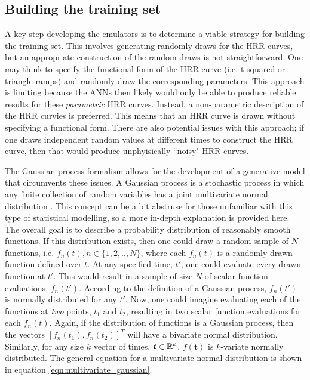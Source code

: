 \documentclass{article}
\begin{document}
\subsection{Building the training set}
A key step developing the emulators is to determine a viable strategy for building the training set. This involves generating randomly draws for the HRR curves, but an appropriate construction of the random draws is not straightforward. One may think to specify the functional form of the HRR curve (i.e. t-squared or triangle ramps) and randomly draw the corresponding parameters. This approach is limiting because the ANNs then likely would only be able to produce reliable results for these \textit{parametric} HRR curves. Instead, a non-parametric description of the HRR curvies is preferred. This means that an HRR curve is drawn without specifying a functional form. There are also potential issues with this approach; if one draws independent random values at different times to construct the HRR curve, then that would produce unphyisically ``noisy" HRR curves.

The Gaussian process formalism allows for the development of a generative model that circumvents these issues. A Gaussian process is a stochastic process in which any finite collection of random variables has a joint multivariate normal distribution \cite{lee2017deep}. This concept can be a bit abstruse for those unfamiliar with this type of statistical modelling, so a more in-depth explanation is provided here. The overall goal is to describe a probability distribution of reasonably smooth functions. If this distribution exists, then one could draw a random sample of $N$ functions, i.e. $f_n(t), n \in \{1,2,.., N\}$, where each $f_n(t)$ is a randomly drawn function defined over $t$. At any specified time, $t'$, one could evaluate every drawn function at $t'$.  This would result in a sample of size $N$ of scalar function evaluations, $f_n(t')$. According to the definition of a Gaussian process, $f_n(t')$ is normally distributed for any $t'$. Now, one could imagine evaluating each of the functions at \textit{two} points, $t_1$ and $t_2$, resulting in two scalar function evaluations for each $f_n(t)$. Again, if the distribution of functions is a Gaussian process, then the vectors $[f_n(t_1), f_n(t_2)]^T$ will have a bivariate normal distribution. Similarly, for any size $k$ vector of times, $\boldsymbol{t} \in \mathbb{R}^k$, $f(\boldsymbol{t})$ is $k$-variate normally distributed. The general equation for a multivariate normal distribution is shown in equation \ref{eqn:multivariate_gaussian}.
\end{document}

